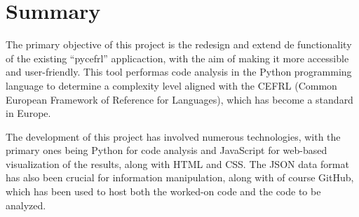 \documentclass[a4paper, 12pt]{book}
\begin{document}

\chapter*{Summary}

The primary objective of this project is the redesign and extend de functionality of the existing ``pycefrl'' applicaction, with the aim of making it more accessible and user-friendly. This tool performas code analysis in the Python programming language to determine a complexity level aligned with the CEFRL (Common European Framework of Reference for Languages), which has become a standard in Europe.

The development of this project has involved numerous technologies, with the primary ones being Python for code analysis and JavaScript for web-based visualization of the results, along with HTML and CSS. The JSON data format has also been crucial for information manipulation, along with of course GitHub, which has been used to host both the worked-on code and the code to be analyzed.



\tableofcontents 
\cleardoublepage
\listoffigures %


\end{document}
